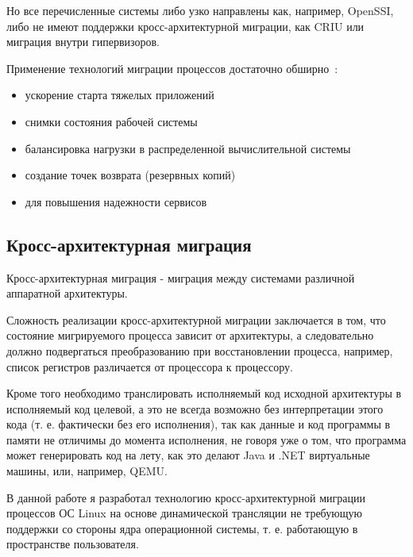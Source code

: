 Но все перечисленные системы либо узко направлены как, например, OpenSSI, либо не имеют поддержки кросс-архитектурной миграции, как CRIU или миграция внутри гипервизоров.

Применение технологий миграции процессов достаточно обширно~\cite{criu_yandex_presentation}:

\begin{itemize}

    \item ускорение старта тяжелых приложений
    \item снимки состояния рабочей системы
    \item балансировка нагрузки в распределенной вычислительной системы
    \item создание точек возврата (резервных копий)
    \item для повышения надежности сервисов

\end{itemize}

\subsection{Кросс-архитектурная миграция}

\begin{Def}\label{cross_migration}
Кросс-архитектурная миграция - миграция между системами различной аппаратной архитектуры.
\end{Def}

Сложность реализации кросс-архитектурной миграции заключается в том, что состояние мигрируемого процесса зависит от архитектуры, а следовательно должно подвергаться преобразованию при восстановлении процесса, например, список регистров различается от процессора к процессору.

Кроме того необходимо транслировать исполняемый код исходной архитектуры в исполняемый код целевой, а это не всегда возможно без интерпретации этого кода (т. е. фактически без его исполнения), так как данные и код программы в памяти не отличимы до момента исполнения, не говоря уже о том, что программа может генерировать код на лету, как это делают Java и .NET виртуальные машины, или, например, QEMU.

В данной работе я разработал технологию кросс-архитектурной миграции процессов ОС Linux на основе динамической трансляции не требующую поддержки со стороны ядра операционной системы, т. е. работающую в пространстве пользователя.
